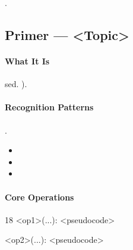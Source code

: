 .

\subsection{Primer — <Topic>}

\paragraph{What It Is}
sed.
).

\paragraph{Recognition Patterns}
.
\begin{itemize}[nosep]
  \item <Cue 1>
  \item <Cue 2>
  \item <Cue 3>
\end{itemize}

\paragraph{Core Operations}
\begin{CodeBlock}[style=pseudo,caption={<Topic>: Core Operations (pseudocode)}]{
18}
<op1>(...):
  <pseudocode>

<op2>(...):
  <pseudocode>
\end{CodeBlock}

